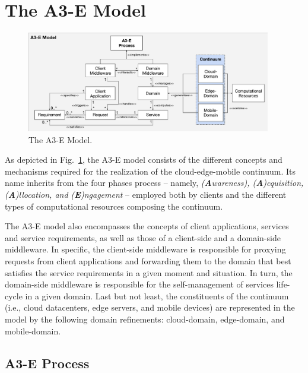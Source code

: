 \section{The A3-E Model}\label{sec:proposal}

\begin{figure}[tbp]
	\includegraphics[width=0.95\textwidth]{figs/A3-E-model.pdf}
	\caption{The A3-E Model.}
	\label{fig:A3-E-model}
\end{figure}

As depicted in Fig.~\ref{fig:A3-E-model}, the A3-E model consists of the different concepts and mechanisms required for the realization of the cloud-edge-mobile continuum. Its name inherits from the four phases process -- namely, \textit{(\textbf{A}wareness), (\textbf{A})cquisition, (\textbf{A})llocation, and (\textbf{E})ngagement} -- employed both by clients and the different types of computational resources composing the continuum. 

The A3-E model also encompasses the concepts of client applications, services and service requirements, as well as those of a client-side and a domain-side middleware. In specific, the client-side middleware is responsible for proxying requests from client applications and forwarding them to the domain that best satisfies the service requirements in a given moment and situation. In turn, the domain-side middleware is responsible for the self-management of services life-cycle in a given domain. Last but not least, the constituents of the continuum (i.e., cloud datacenters, edge servers, and mobile devices) are represented in the model by the following domain refinements: cloud-domain, edge-domain, and mobile-domain.

\subsection{A3-E Process}\label{sec:A3-E-process}

